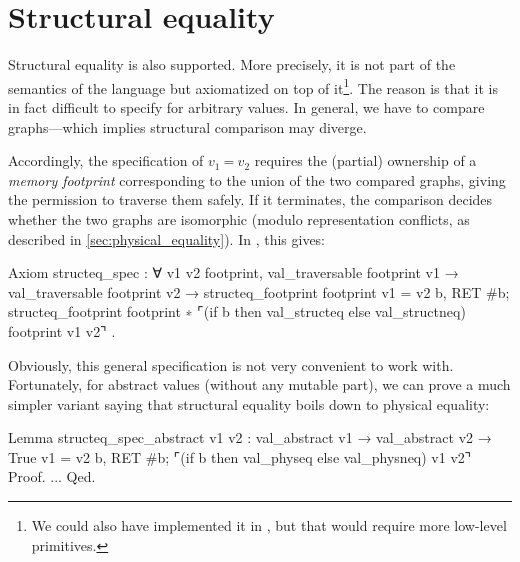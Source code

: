 \section{Structural equality}
\label{sec:structural_equality}

Structural equality is also supported.
More precisely, it is not part of the semantics of the language but axiomatized on top of it\footnote{We could also have implemented it in \ZooLang, but that would require more low-level primitives.}.
The reason is that it is in fact difficult to specify for arbitrary values.
In general, we have to compare graphs---which implies structural comparison may diverge.

Accordingly, the specification of $v_1\ \texttt{=}\ v_2$ requires the (partial) ownership of a \emph{memory footprint} corresponding to the union of the two compared graphs, giving the permission to traverse them safely.
If it terminates, the comparison decides whether the two graphs are isomorphic (modulo representation conflicts, as described in \cref{sec:physical_equality}).
In \Iris, this gives:

\begin{coqcode}
Axiom structeq_spec : ∀ v1 v2 footprint,
  val_traversable footprint v1 →
  val_traversable footprint v2 →
  {{{ structeq_footprint footprint }}}
    v1 = v2
  {{{ b, RET #b;
      structeq_footprint footprint ∗
      ⌜(if b then val_structeq else val_structneq) footprint v1 v2⌝ }}}.
\end{coqcode}

Obviously, this general specification is not very convenient to work with.
Fortunately, for abstract values (without any mutable part), we can prove a much simpler variant saying that structural equality boils down to physical equality:

\begin{coqcode}
Lemma structeq_spec_abstract v1 v2 :
  val_abstract v1 →
  val_abstract v2 →
  {{{ True }}}
    v1 = v2
  {{{ b, RET #b; ⌜(if b then val_physeq else val_physneq) v1 v2⌝ }}}
Proof. ... Qed.
\end{coqcode}



